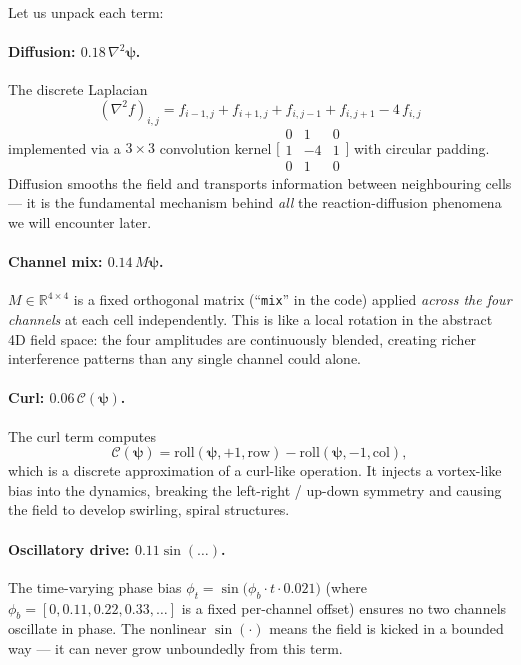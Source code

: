 \documentclass[12pt,a4paper]{article}
\newcommand{\bpsi}{\boldsymbol{\psi}}
\newcommand{\RR}{\mathbb{R}}
\begin{document}
Let us unpack each term:

\paragraph{Diffusion: $0.18\,\nabla^2\bpsi$.}
The discrete Laplacian
\[
  (\nabla^2 f)_{i,j} = f_{i-1,j} + f_{i+1,j} + f_{i,j-1}
    + f_{i,j+1} - 4\,f_{i,j}
\]
implemented via a $3\times3$ convolution kernel
$\bigl[\begin{smallmatrix}0&1&0\\1&{-4}&1\\0&1&0\end{smallmatrix}\bigr]$
with circular padding.
Diffusion smooths the field and transports information between
neighbouring cells — it is the fundamental mechanism behind
\emph{all} the reaction-diffusion phenomena we will encounter later.

\paragraph{Channel mix: $0.14\,M\bpsi$.}
$M \in \RR^{4\times4}$ is a fixed orthogonal matrix
(``\texttt{mix}'' in the code) applied \emph{across the four channels}
at each cell independently.
This is like a local rotation in the abstract 4D field space:
the four amplitudes are continuously blended,
creating richer interference patterns than any single channel could
alone.

\paragraph{Curl: $0.06\,\mathcal{C}(\bpsi)$.}
The curl term computes
\[
  \mathcal{C}(\bpsi) =
  \mathrm{roll}(\bpsi, +1, \text{row}) -
  \mathrm{roll}(\bpsi, -1, \text{col}),
\]
which is a discrete approximation of a curl-like operation.
It injects a vortex-like bias into the dynamics,
breaking the left-right / up-down symmetry and causing
the field to develop swirling, spiral structures.

\paragraph{Oscillatory drive: $0.11\sin(\ldots)$.}
The time-varying phase bias
$\phi_t = \sin\!\bigl(\phi_b \cdot t \cdot 0.021\bigr)$
(where $\phi_b = [0, 0.11, 0.22, 0.33, \ldots]$ is a
fixed per-channel offset) ensures no two channels oscillate
in phase.
The nonlinear $\sin(\cdot)$ means the field is kicked
in a bounded way — it can never grow unboundedly from this term.
\end{document}
